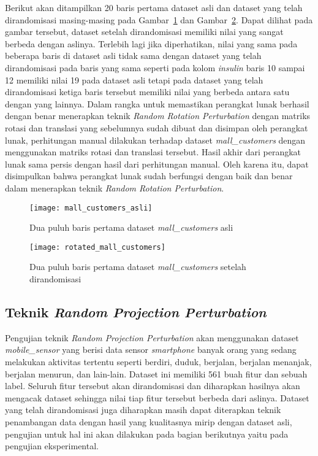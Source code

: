 Berikut akan ditampilkan 20 baris pertama dataset asli dan dataset yang telah dirandomisasi masing-masing pada Gambar~\ref{fig:mall_customers_asli} dan Gambar~\ref{fig:rotated_mall_customers}. Dapat dilihat pada gambar tersebut, dataset setelah dirandomisasi memiliki nilai yang sangat berbeda dengan aslinya. Terlebih lagi jika diperhatikan, nilai yang sama pada beberapa baris di dataset asli tidak sama dengan dataset yang telah dirandomisasi pada baris yang sama seperti pada kolom \textit{insulin} baris 10 sampai 12 memiliki nilai 19 pada dataset asli tetapi pada dataset yang telah dirandomisasi ketiga baris tersebut memiliki nilai yang berbeda antara satu dengan yang lainnya. Dalam rangka untuk memastikan perangkat lunak berhasil dengan benar menerapkan teknik \textit{Random Rotation Perturbation} dengan matriks rotasi dan translasi yang sebelumnya sudah dibuat dan disimpan oleh perangkat lunak, perhitungan manual dilakukan terhadap dataset \textit{mall\_customers} dengan menggunakan matriks rotasi dan translasi tersebut. Hasil akhir dari perangkat lunak sama persis dengan hasil dari perhitungan manual. Oleh karena itu, dapat disimpulkan bahwa perangkat lunak sudah berfungsi dengan baik dan benar dalam menerapkan teknik \textit{Random Rotation Perturbation}.

\begin{figure}
	\centering
	\texttt{[image: mall\_customers\_asli]}
	\caption{Dua puluh baris pertama dataset \textit{mall\_customers} asli}
	\label{fig:mall_customers_asli}
\end{figure}

\begin{figure}
	\centering
	\texttt{[image: rotated\_mall\_customers]}
	\caption{Dua puluh baris pertama dataset \textit{mall\_customers} setelah dirandomisasi}
	\label{fig:rotated_mall_customers}
\end{figure}

\subsection{Teknik \textit{Random Projection Perturbation}}
\label{subsec:rpp-fungsional}

Pengujian teknik \textit{Random Projection Perturbation} akan menggunakan dataset \textit{mobile\_sensor} yang berisi data sensor \textit{smartphone} banyak orang yang sedang melakukan aktivitas tertentu seperti berdiri, duduk, berjalan, berjalan menanjak, berjalan menurun, dan lain-lain. Dataset ini memiliki 561 buah fitur dan sebuah label. Seluruh fitur tersebut akan dirandomisasi dan diharapkan hasilnya akan mengacak dataset sehingga nilai tiap fitur tersebut berbeda dari aslinya. Dataset yang telah dirandomisasi juga diharapkan masih dapat diterapkan teknik penambangan data dengan hasil yang kualitasnya mirip dengan dataset asli, pengujian untuk hal ini akan dilakukan pada bagian berikutnya yaitu pada pengujian eksperimental.

